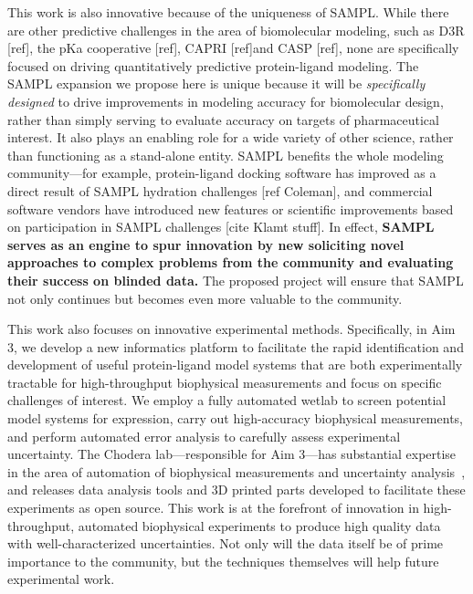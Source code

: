 \documentclass[11pt]{article}
\begin{document}
This work is also innovative because of the uniqueness of SAMPL.
While there are other predictive challenges in the area of biomolecular modeling, such as D3R [ref], the pKa cooperative [ref], CAPRI [ref]and CASP [ref],
none are specifically focused on driving quantitatively predictive protein-ligand modeling.
The SAMPL expansion we propose here is unique because it will be \emph{specifically designed} to drive improvements in modeling accuracy for biomolecular design, rather than simply serving to evaluate accuracy on targets of pharmaceutical interest.
It also plays an enabling role for a wide variety of other science, rather than functioning as a stand-alone entity. 
SAMPL benefits the whole modeling community---for example, protein-ligand docking software has improved as a direct result of SAMPL hydration challenges [ref Coleman], and commercial software vendors have introduced new features or scientific improvements based on participation in SAMPL challenges [cite Klamt stuff].
In effect, {\bf SAMPL serves as an engine to spur innovation by new soliciting novel approaches to complex problems from the community and evaluating their success on blinded data.}
The proposed project will ensure that SAMPL not only continues but becomes even more valuable to the community.
 

This work also focuses on innovative experimental methods.
Specifically, in Aim 3, we develop a new informatics platform to facilitate the rapid identification and development of useful protein-ligand model systems that are both experimentally tractable for high-throughput biophysical measurements and focus on specific challenges of interest.
We employ a fully automated wetlab to screen potential model systems for expression, carry out high-accuracy biophysical measurements, and perform automated error analysis to carefully assess experimental uncertainty.
The Chodera lab---responsible for Aim 3---has substantial expertise in the area of automation of biophysical measurements and uncertainty analysis~\cite{Hanson:2015:JournalofComputer-AidedMolecularDesign}, and releases data analysis tools and 3D printed parts developed to facilitate these experiments as open source. 
This work is at the forefront of innovation in high-throughput, automated biophysical experiments to produce high quality data with well-characterized uncertainties. 
Not only will the data itself be of prime importance to the community, but the techniques themselves will help future experimental work.
\end{document}
